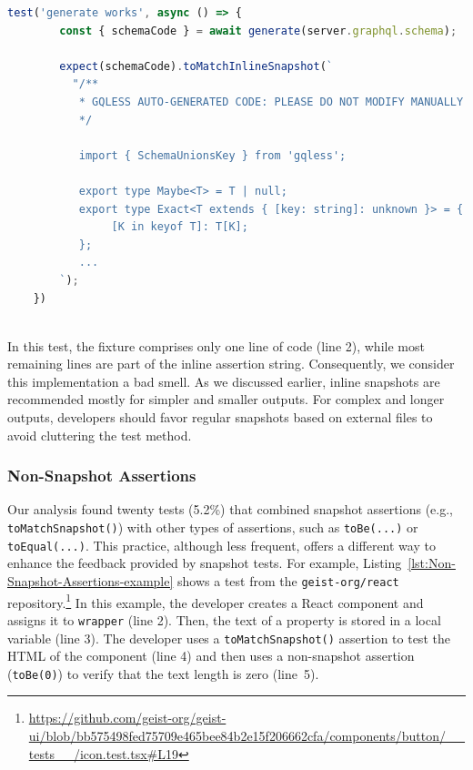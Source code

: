 \documentclass[
	msc, %
	english %
]{../ppgccufmg}
\begin{document}
        \begin{lstlisting}[language=javascript, caption=Large snapshot test due to an inline snapshot, label=lst:large-snapshot-test-example]
    test('generate works', async () => {
        const { schemaCode } = await generate(server.graphql.schema);

        expect(schemaCode).toMatchInlineSnapshot(`
          "/**
           * GQLESS AUTO-GENERATED CODE: PLEASE DO NOT MODIFY MANUALLY
           */

           import { SchemaUnionsKey } from 'gqless';

           export type Maybe<T> = T | null;
           export type Exact<T extends { [key: string]: unknown }> = {
                [K in keyof T]: T[K];
           };
           ...
        `);
    })
        \end{lstlisting}
        ~\\[-2.0pt]
                  
        In this test, the fixture comprises only one line of code (line 2), while most remaining lines are part of the inline assertion string. Consequently, we consider this implementation a bad smell. As we discussed earlier, inline snapshots are recommended mostly for simpler and smaller outputs. For complex and longer outputs, developers should favor regular snapshots based on external files to avoid cluttering the test method.
            
        \subsubsection{Non-Snapshot Assertions}
            
        Our analysis found twenty tests (5.2\%) that combined snapshot assertions (e.g., \texttt{toMatchSnapshot()}) with other types of assertions, such as \texttt{toBe(...)} or \texttt{toEqual(...)}. This practice, although less frequent, offers a different way to enhance the feedback provided by snapshot tests. For example, Listing~\ref{lst:Non-Snapshot-Assertions-example} shows a test from the \texttt{geist-org/react} repository.\footnote{\url{https://github.com/geist-org/geist-ui/blob/bb575498fed75709e465bee84b2e15f206662cfa/components/button/__tests__/icon.test.tsx\#L19}} In this example, the developer creates a React component and assigns it to \texttt{wrapper} (line 2). Then, the text of a property is stored in a local variable (line 3). The developer uses a \texttt{toMatchSnapshot()} assertion to test the HTML of the component (line 4) and then uses a non-snapshot assertion (\texttt{toBe(0)}) to verify that the text length is zero (line~5).\\
            
\end{document}
